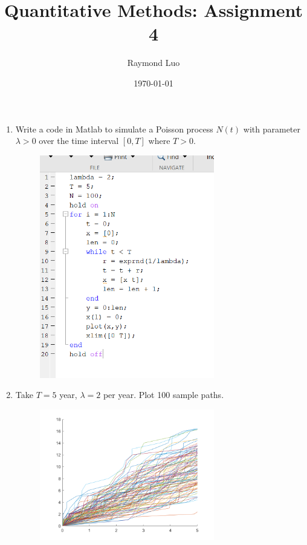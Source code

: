 \documentclass[12pt,twoside, letter]{exam}
\theoremstyle{definition}
\begin{document}
\abovedisplayskip=12pt
\belowdisplayskip=12pt
\abovedisplayshortskip=7pt
\belowdisplayshortskip=10pt
\allowdisplaybreaks

\setlength{\parindent}{18pt}

\title{Quantitative Methods: Assignment 4}
\author{Raymond Luo}
\date{\today}
\maketitle

  \begin{enumerate}
    \item Write a code in Matlab to simulate a Poisson process $N(t)$ with parameter $\lambda > 0$ over the
      time interval $[0,T]$ where $T > 0$.
      \begin{solution}
        \begin{figure}[H]
          \centering
            \includegraphics[width=3in]{Hw4_1a}
        \end{figure}
      \end{solution}
    \item Take $T = 5$ year, $\lambda = 2$ per year. Plot 100 sample paths.
      \begin{solution}
        \begin{figure}[H]
          \centering
            \includegraphics[width=3in]{Hw4_1}
        \end{figure}
      \end{solution}
  \end{enumerate}
\end{document}
